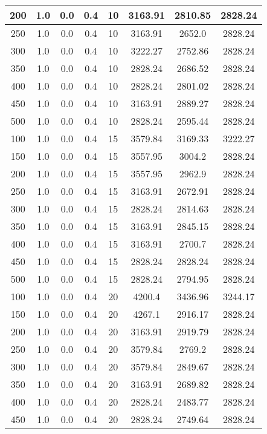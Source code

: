 \documentclass[a4paper, 12pt]{extreport}
\begin{document}
\begin{itemize}
\begin{longtable}{|c|c|c|c|c|c|c|c|}
			200 & 1.0 & 0.0 & 0.4 & 10 & 3163.91 & 2810.85 & 2828.24 \\\hline
			250 & 1.0 & 0.0 & 0.4 & 10 & 3163.91 & 2652.0 & 2828.24 \\\hline
			300 & 1.0 & 0.0 & 0.4 & 10 & 3222.27 & 2752.86 & 2828.24 \\\hline
			350 & 1.0 & 0.0 & 0.4 & 10 & 2828.24 & 2686.52 & 2828.24 \\\hline
			400 & 1.0 & 0.0 & 0.4 & 10 & 2828.24 & 2801.02 & 2828.24 \\\hline
			450 & 1.0 & 0.0 & 0.4 & 10 & 3163.91 & 2889.27 & 2828.24 \\\hline
			500 & 1.0 & 0.0 & 0.4 & 10 & 2828.24 & 2595.44 & 2828.24 \\\hline
			100 & 1.0 & 0.0 & 0.4 & 15 & 3579.84 & 3169.33 & 3222.27 \\\hline
			150 & 1.0 & 0.0 & 0.4 & 15 & 3557.95 & 3004.2 & 2828.24 \\\hline
			200 & 1.0 & 0.0 & 0.4 & 15 & 3557.95 & 2962.9 & 2828.24 \\\hline
			250 & 1.0 & 0.0 & 0.4 & 15 & 3163.91 & 2672.91 & 2828.24 \\\hline
			300 & 1.0 & 0.0 & 0.4 & 15 & 2828.24 & 2814.63 & 2828.24 \\\hline
			350 & 1.0 & 0.0 & 0.4 & 15 & 3163.91 & 2845.15 & 2828.24 \\\hline
			400 & 1.0 & 0.0 & 0.4 & 15 & 3163.91 & 2700.7 & 2828.24 \\\hline
			450 & 1.0 & 0.0 & 0.4 & 15 & 2828.24 & 2828.24 & 2828.24 \\\hline
			500 & 1.0 & 0.0 & 0.4 & 15 & 2828.24 & 2794.95 & 2828.24 \\\hline
			100 & 1.0 & 0.0 & 0.4 & 20 & 4200.4 & 3436.96 & 3244.17 \\\hline
			150 & 1.0 & 0.0 & 0.4 & 20 & 4267.1 & 2916.17 & 2828.24 \\\hline
			200 & 1.0 & 0.0 & 0.4 & 20 & 3163.91 & 2919.79 & 2828.24 \\\hline
			250 & 1.0 & 0.0 & 0.4 & 20 & 3579.84 & 2769.2 & 2828.24 \\\hline
			300 & 1.0 & 0.0 & 0.4 & 20 & 3579.84 & 2849.67 & 2828.24 \\\hline
			350 & 1.0 & 0.0 & 0.4 & 20 & 3163.91 & 2689.82 & 2828.24 \\\hline
			400 & 1.0 & 0.0 & 0.4 & 20 & 2828.24 & 2483.77 & 2828.24 \\\hline
			450 & 1.0 & 0.0 & 0.4 & 20 & 2828.24 & 2749.64 & 2828.24 \\\hline

\end{longtable}
\end{itemize}
\end{document}
